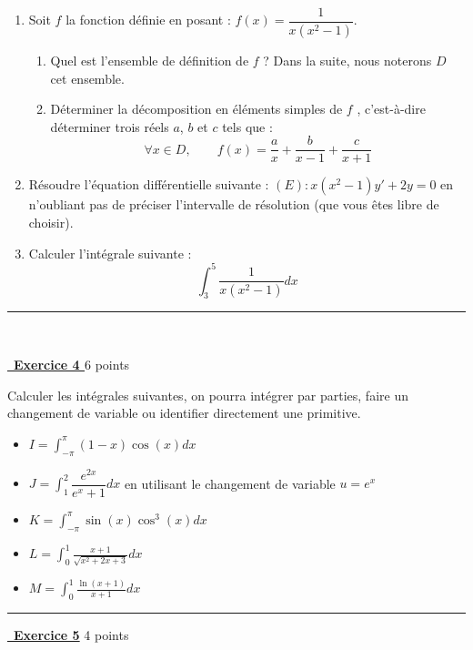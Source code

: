 \documentclass[a4paper,12pt]{article}
\begin{document}
\begin{enumerate}
    \item Soit $f$ la fonction définie en posant : $f (x) = \dfrac{1}{x (x^2 - 1)} .$
\begin{enumerate}
    \item Quel est l'ensemble de définition de $f$ ? Dans la suite, nous noterons $D$ cet ensemble.
\item Déterminer la décomposition en éléments simples de $f$ , c'est-à-dire déterminer trois réels $a$, $b$ et $c$ tels que :
$$\forall x \in D, \qquad f (x) = \dfrac{a}{x} + \dfrac{b}{x- 1} +\dfrac{ c}{x + 1}$$
\end{enumerate}
\item Résoudre l’équation différentielle suivante :
$(E) : x(x^2 - 1)y ' + 2y = 0$
en n’oubliant pas de préciser l’intervalle de résolution (que vous êtes libre de choisir).
\item Calculer l'intégrale suivante :
$$
\int_3^5 \frac{1}{x(x^2-1)} dx
$$

\end{enumerate}



\hfill\break
\hrule
\hfill\break

\newpage

$\,$

\vspace{2em}
\underline {\, \bf{Exercice 4 }}\hfill  6 points
\vspace{1em}



Calculer les intégrales suivantes, on pourra intégrer par parties, faire un changement de variable ou identifier directement une primitive. 
\begin{itemize}[itemsep=0.5em]
  \item $\displaystyle I=\int_{-\pi}^\pi (1 - x) \cos(x)dx$
  \item $\displaystyle J=\int_{1}^2 \dfrac{e^{2x}}{e^x+1}dx$ en utilisant le changement de variable $u = e^x$
  \item $\displaystyle K=\int_{-\pi}^\pi \sin(x)\cos^3(x)dx$
  \item $\displaystyle L=\int_0^1 \frac{x+1}{\sqrt{x^2+2x+3}}dx$
  \item $\displaystyle M=\int_0^1 \frac{\ln(x+1)}{x+1}dx$
  \end{itemize}




\hfill\break
\hrule
\hfill\break

\vspace{2em}
\underline {\, \bf{Exercice 5}} \hfill 4 points\\
\vspace{1em}
\medskip
\end{document}
